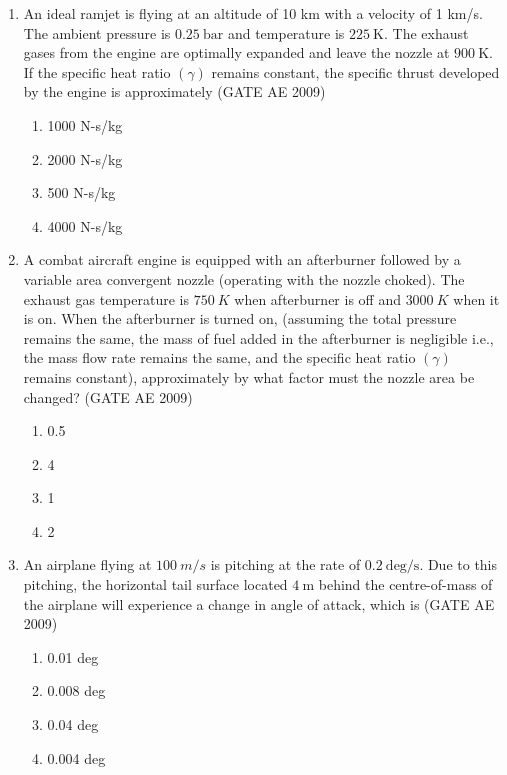 \documentclass[journal,12pt,onecolumn]{IEEEtran}
\theoremstyle{remark}
\begin{document}
\begin{flushleft}
\begin{enumerate}
\item 
An ideal ramjet is flying at an altitude of 10 km with a velocity of 1 km/s. The ambient pressure is \(0.25~\text{bar}\) and temperature is \(225~\text{K}\). The exhaust gases from the engine are optimally expanded and leave the nozzle at \(900~\text{K}\). If the specific heat ratio \((\gamma)\) remains constant, the specific thrust developed by the engine is approximately  
\hfill(GATE AE 2009)
\begin{multicols}{2}
\begin{enumerate}
\item 1000 N-s/kg
\item 2000 N-s/kg
\item 500 N-s/kg
\item 4000 N-s/kg
\end{enumerate}
\end{multicols}

\item 
A combat aircraft engine is equipped with an afterburner followed by a variable area convergent nozzle (operating with the nozzle choked). The exhaust gas temperature is \(750~K\) when afterburner is off and \(3000~K\) when it is on. When the afterburner is turned on, (assuming the total pressure remains the same, the mass of fuel added in the afterburner is negligible i.e., the mass flow rate remains the same, and the specific heat ratio \((\gamma)\) remains constant), approximately by what factor must the nozzle area be changed?  
\hfill(GATE AE 2009)
\begin{multicols}{2}
\begin{enumerate}
\item 0.5
\item 4
\item 1
\item 2
\end{enumerate}
\end{multicols}

\item 
An airplane flying at \(100~m/s\) is pitching at the rate of \(0.2~\text{deg/s}\). Due to this pitching, the horizontal tail surface located \(4~\text{m}\) behind the centre-of-mass of the airplane will experience a change in angle of attack, which is  
\hfill(GATE AE 2009)
\begin{multicols}{2}
\begin{enumerate}
\item 0.01 deg
\item 0.008 deg
\item 0.04 deg
\item 0.004 deg
\end{enumerate}
\end{multicols}


\end{enumerate}
\end{flushleft}
\end{document}
